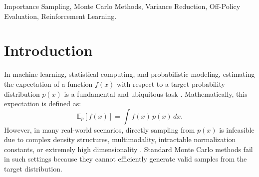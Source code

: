 \documentclass[conference,compsoc]{IEEEtran}
\begin{document}
\begin{abstract}
Importance Sampling (IS) is a fundamental Monte Carlo technique for estimating expectations under intractable target distributions. Instead of sampling directly from the target distribution \(p(x)\), which is often difficult or impossible, IS samples from an easy-to-sample proposal distribution \(q(x)\) and corrects the bias using importance weights. This report introduces the mathematical derivation, core properties, applications in reinforcement learning, and four key experimental validations. Experiments show that IS effectively reduces variance with an optimal proposal, accurately approximates multimodal distributions, avoids tail weight explosion with heavy-tailed proposals, and suffers from weight collapse in high dimensions. Importance Sampling remains an essential tool for off-policy evaluation, Bayesian inference, and rare-event simulation in modern AI \cite{robert2004monte, mcbook, sugiyama2015statistical}.
\end{abstract}

\begin{IEEEkeywords}
Importance Sampling, Monte Carlo Methods, Variance Reduction, Off-Policy Evaluation, Reinforcement Learning.
\end{IEEEkeywords}

%
\IEEEpeerreviewmaketitle



\section{Introduction}
In machine learning, statistical computing, and probabilistic modeling, estimating the expectation of a function \(f(x)\) with respect to a target probability distribution \(p(x)\) is a fundamental and ubiquitous task \cite{robert2004monte, mcbook}. Mathematically, this expectation is defined as:
\[
\mathbb{E}_{p}[f(x)] = \int f(x)\,p(x)\,dx.
\]
However, in many real-world scenarios, directly sampling from \(p(x)\) is infeasible due to complex density structures, multimodality, intractable normalization constants, or extremely high dimensionality \cite{robert2004monte}. Standard Monte Carlo methods fail in such settings because they cannot efficiently generate valid samples from the target distribution.
\end{document}
